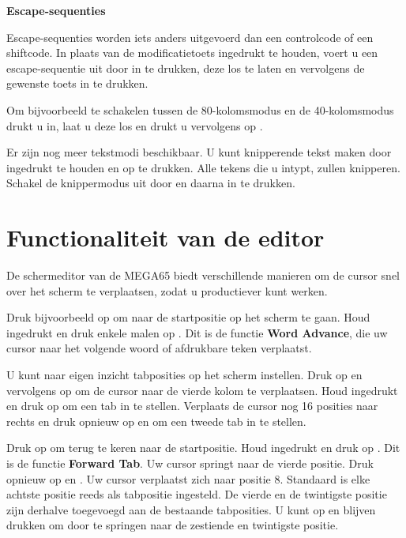 \needspace{2cm}
\textbf{Escape-sequenties}

Escape-sequenties worden iets anders uitgevoerd dan een controlcode of een shiftcode. In plaats van de modificatietoets ingedrukt te houden, voert u een escape-sequentie uit door  in te drukken, deze los te laten en vervolgens de gewenste toets in te drukken.

Om bijvoorbeeld te schakelen tussen de 80-kolomsmodus en de 40-kolomsmodus drukt u  in, laat u deze los en drukt u vervolgens op .

Er zijn nog meer tekstmodi beschikbaar. U kunt knipperende tekst maken door  ingedrukt te houden en op  te drukken. Alle tekens die u intypt, zullen knipperen. Schakel de knippermodus uit door  en daarna  in te drukken.


\section{Functionaliteit van de editor}

De schermeditor van de MEGA65 biedt verschillende manieren om de cursor snel over het scherm te verplaatsen, zodat u productiever kunt werken.

Druk bijvoorbeeld op  om naar de startpositie op het scherm te gaan. Houd  ingedrukt en druk enkele malen op . Dit is de functie \textbf{Word Advance}, die uw cursor naar het volgende woord of afdrukbare teken verplaatst.

U kunt naar eigen inzicht tabposities op het scherm instellen. Druk op  en vervolgens op \megakey{$\rightarrow$} om de cursor naar de vierde kolom te verplaatsen. Houd  ingedrukt en druk op  om een tab in te stellen. Verplaats de cursor nog 16 posities naar rechts en druk opnieuw op  en  om een tweede tab in te stellen.

Druk op  om terug te keren naar de startpositie. Houd  ingedrukt en druk op . Dit is de functie \textbf{Forward Tab}. Uw cursor springt naar de vierde positie. Druk opnieuw op  en . Uw cursor verplaatst zich naar positie 8. Standaard is elke achtste positie reeds als tabpositie ingesteld. De vierde en de twintigste positie zijn derhalve toegevoegd aan de bestaande tabposities. U kunt op  en  blijven drukken om door te springen naar de zestiende en twintigste positie.


